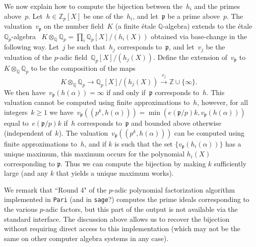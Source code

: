 \documentclass{article}
\def\Z{{\mathbb Z}}
\def\Q{{\mathbb Q}}
\def\p{{\mathfrak p}}
\begin{document}
We now explain how to compute the bijection between the~$h_i$ and the primes
above~$p$. Let~$h\in\Z_p[X]$ be one of the~$h_i$, and let~$\p$ be a prime
above~$p$. The valuation~$v_{\p}$ on the number field~$K$ (a finite \'etale $\Q$-algebra) extends to the \'etale $\Q_p$-algebra ~$K\otimes_{\Q}\Q_p = \prod_i
\Q_p[X]/(h_i(X))$ obtained via base-change in the following way.
Let~$j$ be such that~$h_{j}$ corresponds
to~$\p$, and let~$v_j$ be the valuation of the $p$-adic field~$\Q_p[X]/(h_j(X))$.
Define the extension of~$v_\p$ to $K\otimes_\Q\Q_p$ to be the composition of the maps
\[
  K\otimes_{\Q}\Q_p \longrightarrow \Q_p[X]/(h_j(X)) \stackrel{v_j}{\longrightarrow} \Z\cup\{\infty\}.
\]
We then have~$v_{\p}(h(\alpha)) = \infty$ if and only
if~$\p$ corresponds to~$h$.
This valuation cannot be computed using finite
approximations to~$h$, however, for all integers~$k\ge 1$ we have~$v_\p((p^k,h(\alpha)))
= \min(e(\p/p)k, v_\p(h(\alpha)))$ equal to~$e(\p/p)k$
if~$h$ corresponds to~$\p$ and bounded above otherwise (independent of~$k$). The
valuation~$v_\p((p^k,h(\alpha)))$ can be computed using finite approximations
to~$h$, and if $k$ is such that the set $\{v_\p(h_i(\alpha))\}$ has a unique maximum, this maximum occurs for the polynomial $h_i(X)$ corresponding to $\p$.
Thus we can compute the bijection by making $k$ sufficiently large (and any $k$ that yields a unique maximum works).

We remark that ``Round 4" of the $p$-adic polynomial factorization algorithm
implemented in \texttt{Pari} (and in \texttt{sage}?) \cite{Roblot}
computes the prime ideals corresponding to the various $p$-adic factors, but
this part of the output is not available via the standard interface.
The discussion above allows us to recover the bijection without requiring direct access to this implementation (which may not be the same on other computer algebra systems in any case).
\end{document}
